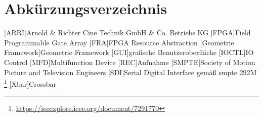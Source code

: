 
\chapter{Abk\"urzungsverzeichnis}


\begin{acronym}
	[ARRI]{Arnold \& Richter Cine Technik GmbH \& Co. Betriebs KG}
	[FPGA]{Field Programmable Gate Array}
	[FRA]{FPGA Resource Abstraction}
	[Geometrie Framework]{Geometrie Framework}
	[GUI]{grafische Benutzeroberfläche}
	[IOCTL]{IO Control}
	[MFD]{Multifunction Device}
	[REC]{Aufnahme}
	[SMPTE]{Society of Motion Picture and Television Engineers}
	[SDI]{Serial Digital Interface} gemäß \ac{smpte} 292M \footnote{\url{https://ieeexplore.ieee.org/document/7291770}}
	[Xbar]{Crossbar}
	
\end{acronym}




